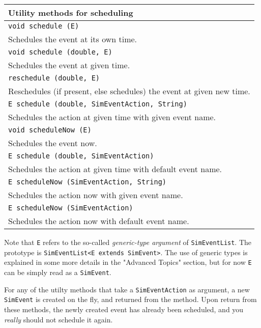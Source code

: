 \documentclass[12pt]{book}
\begin{document}
\begin{tabular}{|l|}
  \hline
  {\bf Utility methods for scheduling} \\
  \hline
  \lstinline[basicstyle=\footnotesize]!void schedule (E)! \\
    Schedules the event at its own time.\\
  \hline
  \lstinline[basicstyle=\footnotesize]!void schedule (double, E)! \\
    Schedules the event at given time.\\
  \hline
  \lstinline[basicstyle=\footnotesize]!reschedule (double, E)! \\
    Reschedules (if present, else schedules) the event at given new time.\\
  \hline
  \lstinline[basicstyle=\footnotesize]!E schedule (double, SimEventAction, String)! \\
    Schedules the action at given time with given event name.\\
  \hline
  \lstinline[basicstyle=\footnotesize]!void scheduleNow (E)! \\
    Schedules the event now.\\
  \hline
  \lstinline[basicstyle=\footnotesize]!E schedule (double, SimEventAction)! \\
    Schedules the action at given time with default event name.\\
  \hline
  \lstinline[basicstyle=\footnotesize]!E scheduleNow (SimEventAction, String)! \\
    Schedules the action now with given event name.\\
  \hline
  \lstinline[basicstyle=\footnotesize]!E scheduleNow (SimEventAction)! \\
    Schedules the action now with default event name.\\
  \hline
\end{tabular}

Note that \lstinline{E} refers to the so-called {\em generic-type argument\/}
  of \lstinline{SimEventList}.
The prototype is \lstinline!SimEventList<E extends SimEvent>!.
The use of generic types is explained in some more details in the "Advanced Topics" section,
  but for now \lstinline!E! can be simply read as a \lstinline{SimEvent}.

For any of the utilty methods that take a \lstinline{SimEventAction}
  as argument, a new \lstinline{SimEvent} is created on the fly,
  and returned from the method.
Upon return from these methods,
  the newly created event has already been scheduled,
  and you {\em really\/} should not schedule it again.
\end{document}
